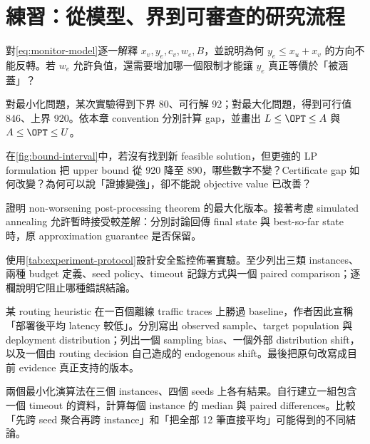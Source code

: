 \documentclass[11pt,a4paper,oneside,openany]{book}
\begin{document}
\section{練習：從模型、界到可審查的研究流程}
\begin{exercise}
對\cref{eq:monitor-model}逐一解釋 $x_v,y_e,c_v,w_e,B$，並說明為何 $y_e\le x_u+x_v$ 的方向不能反轉。若 $w_e$ 允許負值，還需要增加哪一個限制才能讓 $y_e$ 真正等價於「被涵蓋」？
\end{exercise}
\begin{exercise}
對最小化問題，某次實驗得到下界 80、可行解 92；對最大化問題，得到可行值 846、上界 920。依本章 convention 分別計算 gap，並畫出 $L\le\OPT\le A$ 與 $A\le\OPT\le U$。
\end{exercise}
\begin{exercise}
在\cref{fig:bound-interval}中，若沒有找到新 feasible solution，但更強的 LP formulation 把 upper bound 從 920 降至 890，哪些數字不變？Certificate gap 如何改變？為何可以說「證據變強」，卻不能說 objective value 已改善？
\end{exercise}
\begin{exercise}
證明 non-worsening post-processing theorem 的最大化版本。接著考慮 simulated annealing 允許暫時接受較差解：分別討論回傳 final state 與 best-so-far state 時，原 approximation guarantee 是否保留。
\end{exercise}
\begin{exercise}
使用\cref{tab:experiment-protocol}設計安全監控佈署實驗。至少列出三類 instances、兩種 budget 定義、seed policy、timeout 記錄方式與一個 paired comparison；逐欄說明它阻止哪種錯誤結論。
\end{exercise}
\begin{exercise}
某 routing heuristic 在一百個離線 traffic traces 上勝過 baseline，作者因此宣稱「部署後平均 latency 較低」。分別寫出 observed sample、target population 與 deployment distribution；列出一個 sampling bias、一個外部 distribution shift，以及一個由 routing decision 自己造成的 endogenous shift。最後把原句改寫成目前 evidence 真正支持的版本。
\end{exercise}
\begin{exercise}
兩個最小化演算法在三個 instances、四個 seeds 上各有結果。自行建立一組包含一個 timeout 的資料，計算每個 instance 的 median 與 paired differences。比較「先跨 seed 聚合再跨 instance」和「把全部 12 筆直接平均」可能得到的不同結論。
\end{exercise}
\end{document}
